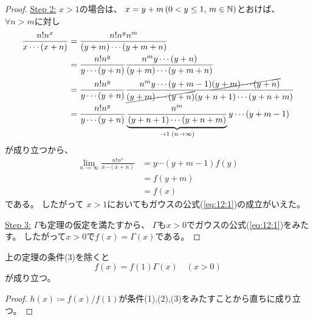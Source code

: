 \documentclass[report]{jlreq}
\begin{document}
\begin{proof}
    \underline{Step 2:}
    $x > 1$の場合は、
    $x = y + m\, (0 < y \le 1,\, m \in \mathbb{N})$とおけば、
    $\forall n > m$に対し
    \begin{equation}
        \begin{split}
            \frac{n! n^x}{x \cdots (x + n)}
                &= \frac{n! n^y n^m}{(y + m) \cdots (y + m + n)} \\
                &= \frac{n! n^y}{y \cdots (y + n)}
                    \frac{n^m y \cdots (y + n)}{(y + m) \cdots (y + m + n)} \\
                &= \frac{n! n^y}{y \cdots (y + n)}
                    \frac{n^m y \cdots (y + m - 1) \cancel{(y + m) \cdots (y + n)}}
                        {\cancel{(y + m) \cdots (y + n)} (y + n + 1) \cdots (y + n + m)} \\
                &= \frac{n! n^y}{y \cdots (y + n)}
                    \underbrace{\frac{n^m}{(y + n + 1) \cdots (y + n + m)}}_{\to 1\; (n \to \infty)}
                    y \cdots (y + m - 1)
        \end{split}
    \end{equation}
    が成り立つから、
    \begin{equation}
        \begin{split}
            \lim_{n \to \infty} \frac{n! n^x}{x \cdots (x + n)}
                &= y \cdots (y + m - 1) f(y) \\
                &= f(y + m) \\
                &= f(x)
        \end{split}
    \end{equation}
    である。
    したがって
    $x > 1$においてもガウスの公式(\ref{eq:12:1})の成立がいえた。

    \underline{Step 3:}
    $\Gamma$も定理の仮定を満たすから、
    $\Gamma$も$x > 0$でガウスの公式(\ref{eq:12:1})をみたす。
    したがって$x > 0$で$f(x) = \Gamma(x)$である。
\end{proof}

    \begin{corollary}
        上の定理の条件(3)を除くと
        \begin{equation}
            f(x) = f(1) \Gamma(x) \quad (x > 0)
        \end{equation}
        が成り立つ。
        \label{11:cor:1}
    \end{corollary}

\begin{proof}
    $h(x) \coloneqq f(x) / f(1)$が条件(1),(2),(3)をみたすことから直ちに成り立つ。
\end{proof}
\end{document}
